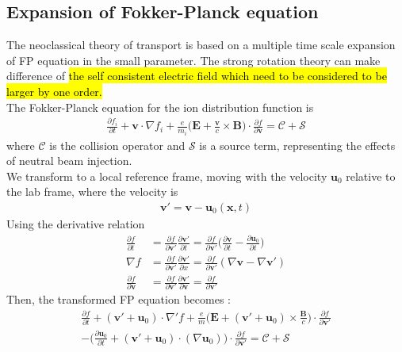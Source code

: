 \subsection{Expansion of Fokker-Planck equation}
The neoclassical theory of transport is based on a multiple time scale expansion of FP equation in the small parameter. The strong rotation theory can make difference of \hl{the self consistent electric field which need to be considered to be larger by one order.}\\
The Fokker-Planck equation for the ion distribution function is 
\begin{align}
    \frac{\partial f_i}{\partial t}+\bm{v} \cdot \nabla f_i + \frac{e}{m_i}\Big( \bm{E} + \frac{\bm{v}}{c}\times \bm{B}\Big) \cdot \frac{\partial f}{\partial \bm{v}} = \mathcal{C} + \mathcal{S}
\end{align}
where $\mathcal{C}$ is the collision operator and $\mathcal{S}$ is a source term, representing the effects of neutral
beam injection. \\
We transform to a local reference frame, moving with the velocity $\bm{u}_0$ relative to the lab frame, where the velocity is 
\begin{align}
    \bm{v}' = \bm{v}-\bm{u}_0(\bm{x},t)
\end{align}
Using the derivative relation
\begin{align}
    \frac{\partial f}{\partial t} &= \frac{\partial f}{\partial \bm{v}'} \frac{\partial \bm{v}'}{\partial t} = \frac{\partial f}{\partial \bm{v}'}\Big(\frac{\partial \bm{v}}{\partial t} - \frac{\partial \bm{u}_0}{\partial t}\Big) \nonumber \\
    \nabla f &= \frac{\partial f}{\partial \bm{v}'}\frac{\partial \bm{v}'}{\partial x} = \frac{\partial f}{\partial \bm{v}'}(\nabla \bm{v} - \nabla \bm{v'}) \nonumber \\
    \frac{\partial f}{\partial \bm{v}} &= \frac{\partial f}{\partial \bm{v}'}\frac{\partial \bm{v}'}{\partial \bm{v}}=\frac{\partial f}{\partial \bm{v}'}
\end{align}
Then, the transformed FP equation becomes : 
\begin{align}
    \frac{\partial f}{\partial t} + (\bm{v}' + \bm{u}_0) \cdot \nabla 'f + \frac{e}{m}\Big( \bm{E} + (\bm{v}'+\bm{u}_0) \times \frac{\bm{B}}{c}\Big)\cdot \frac{\partial f}{\partial \bm{v}'} \nonumber \\
    -\Big(\frac{\partial \bm{u}_0}{\partial t}+ (\bm{v}'+\bm{u}_0)\cdot (\nabla \bm{u}_0)\Big) \cdot \frac{\partial f}{\partial \bm{v}'}= \mathcal{C} + \mathcal{S}
\end{align}
